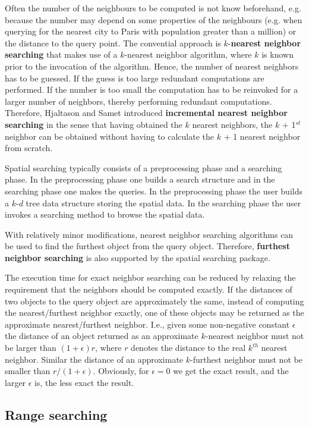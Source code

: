 Often the number of the neighbours to be computed is not know beforehand, e.g. because the number
may depend on some properties of the neighbours  
(e.g. when querying for the nearest city to Paris with
population greater than a million) or the distance to the query point.
The convential approach is $k$-{\bf nearest neighbor searching} that makes use of a $k$-nearest neighbor
algorithm, where $k$ is known prior to the invocation of the algorithm.
Hence, the number of nearest neighbors has to be
guessed. If the guess is too large redundant computations are performed.
If the number is too small the computation has to be  
reinvoked for a larger number of neighbors, thereby performing redundant computations.
Therefore, Hjaltason and Samet \cite{hs-rsd-95} introduced {\bf incremental nearest neighbor searching} in the sense that having obtained
the $k$ nearest neighbors, the $k$ + 1$^{st}$ neighbor can be obtained without
having to calculate the $k$ + 1 nearest neighbor from scratch.
 

Spatial searching typically consists of a preprocessing phase and a searching phase. 
In the preprocessing phase one builds a search structure 
and in the searching phase 
one makes the queries. 
In the preprocessing phase the user builds a $k$-$d$ tree data structure storing the spatial data.
In the searching phase the user invokes a searching method to browse the spatial data.

With relatively minor modifications, nearest neighbor searching algorithms can be
used to find the furthest object from the query object. 
Therefore, {\bf furthest neighbor searching} is also supported
by the spatial searching package.

The execution time for exact neighbor searching can be reduced by relaxing
the requirement that the neighbors should be computed exactly.
If the distances of two objects to the query object are approximately the same,
instead of computing the nearest/furthest neighbor exactly, one of these objects may
be returned as the approximate nearest/furthest neighbor. I.e., given some non-negative constant
$\epsilon$ the distance of an object returned as an approximate $k$-nearest neighbor
must not be larger than $(1+\epsilon)r$, where
$r$ denotes the distance to the real $k^{th}$ nearest neighbor.
Similar the distance of an approximate $k$-furthest neighbor must not be smaller than $r/(1+\epsilon)$. 
Obviously, for $\epsilon=0$ we get the exact result, and the larger $\epsilon$ is, the less exact the result.

\subsection{Range searching}

